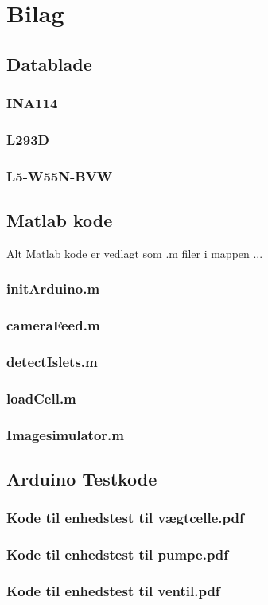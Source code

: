 \chapter{Bilag}
\section{Datablade}
\subsection{INA114}
\label{bilag:INA114}
\subsection{L293D}
\label{bilag:L293D}
\subsection{L5-W55N-BVW}
\label{bilag:L5-W55N-BVW}
\section{Matlab kode}
Alt Matlab kode er vedlagt som .m filer i mappen ... 
\subsection{initArduino.m} \label{bilag:initArduino}
\subsection{cameraFeed.m} \label{bilag:cameraFeed}
\subsection{detectIslets.m}
\subsection{loadCell.m}
\subsection{Imagesimulator.m} \label{bilag:camsimulation}
\section{Arduino Testkode}
\subsection{Kode til enhedstest til vægtcelle.pdf} 
\label{bilag:TKloadcell}
\subsection{Kode til enhedstest til pumpe.pdf}
\label{bilag:TKpumpe}
\subsection{Kode til enhedstest til ventil.pdf}
\label{bilag:TKventil}
